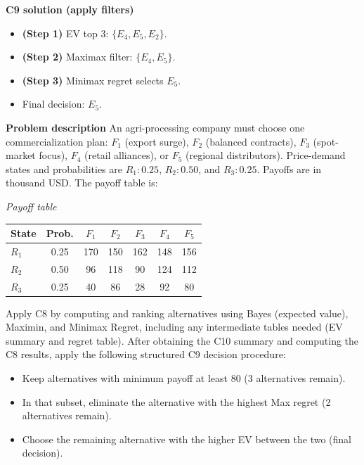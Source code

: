 \begin{ExamProblems}
		\textbf{C9 solution (apply filters)}\par
		\begin{itemize}
			\item \textbf{(Step 1)} EV top 3: $\{E_4,E_5,E_2\}$.
			\item \textbf{(Step 2)} Maximax filter: $\{E_4,E_5\}$.
			\item \textbf{(Step 3)} Minimax regret selects $E_5$.
			\item Final decision: $E_5$.
		\end{itemize}
		
		\newpage
		\item
		\textbf{Problem description}
		An agri-processing company must choose one commercialization plan: $F_1$ (export surge), $F_2$ (balanced contracts), $F_3$ (spot-market focus), $F_4$ (retail alliances), or $F_5$ (regional distributors).
		Price-demand states and probabilities are $R_1:0.25$, $R_2:0.50$, and $R_3:0.25$. Payoffs are in thousand USD. The payoff table is:
		
		\begin{center}
			\textit{Payoff table} \\
			\begin{tabular}{l c c c c c c}
				\hline
				State& Prob. & $F_1$ & $F_2$ & $F_3$ & $F_4$ & $F_5$ \\
				\hline
				$R_1$ & 0.25 & 170 & 150 & 162 & 148 & 156 \\
				$R_2$ & 0.50 & 96 & 118 & 90 & 124 & 112 \\
				$R_3$ & 0.25 & 40 & 86 & 28 & 92 & 80 \\
				\hline
			\end{tabular}
		\end{center}
		
		Apply C8 by computing and ranking alternatives using Bayes (expected value), Maximin, and Minimax Regret, including any intermediate tables needed (EV summary and regret table).
		After obtaining the C10 summary and computing the C8 results, apply the following structured C9 decision procedure:
		\begin{itemize}
			\item Keep alternatives with minimum payoff at least 80 (3 alternatives remain).
			\item In that subset, eliminate the alternative with the highest Max regret (2 alternatives remain).
			\item Choose the remaining alternative with the higher EV between the two (final decision).
		\end{itemize}
		

\end{ExamProblems}
